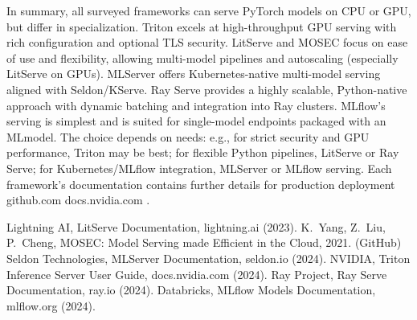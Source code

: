 In summary, all surveyed frameworks can serve PyTorch models on CPU or GPU, but differ in specialization. Triton excels at high-throughput GPU serving with rich configuration and optional TLS security. LitServe and MOSEC focus on ease of use and flexibility, allowing multi-model pipelines and autoscaling (especially LitServe on GPUs). MLServer offers Kubernetes-native multi-model serving aligned with Seldon/KServe. Ray Serve provides a highly scalable, Python-native approach with dynamic batching and integration into Ray clusters. MLflow’s serving is simplest and is suited for single-model endpoints packaged with an MLmodel. The choice depends on needs: e.g., for strict security and GPU performance, Triton may be best; for flexible Python pipelines, LitServe or Ray Serve; for Kubernetes/MLflow integration, MLServer or MLflow serving. Each framework’s documentation contains further details for production deployment
github.com
docs.nvidia.com
.

\begin{thebibliography}{6}
Lightning AI, LitServe Documentation, lightning.ai (2023).
K.~Yang, Z.~Liu, P.~Cheng, MOSEC: Model Serving made Efficient in the Cloud, 2021. (GitHub)
Seldon Technologies, MLServer Documentation, seldon.io (2024).
NVIDIA, Triton Inference Server User Guide, docs.nvidia.com (2024).
Ray Project, Ray Serve Documentation, ray.io (2024).
Databricks, MLflow Models Documentation, mlflow.org (2024).
\end{thebibliography}
